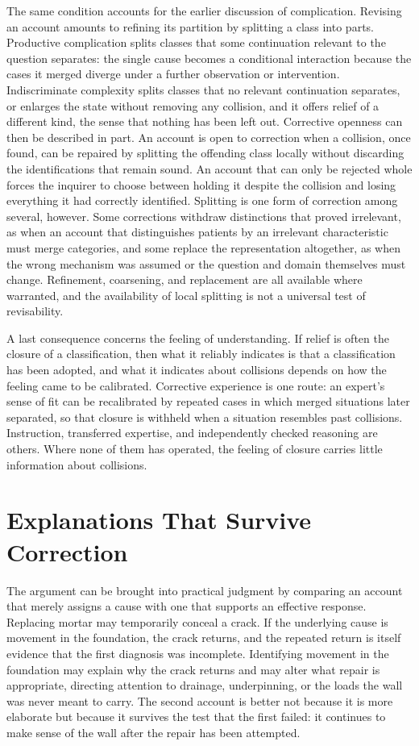 \documentclass[11pt,letterpaper]{article}
\theoremstyle{definition}
\begin{document}
The same condition accounts for the earlier discussion of complication. Revising an account amounts to refining its partition by splitting a class into parts. Productive complication splits classes that some continuation relevant to the question separates: the single cause becomes a conditional interaction because the cases it merged diverge under a further observation or intervention. Indiscriminate complexity splits classes that no relevant continuation separates, or enlarges the state without removing any collision, and it offers relief of a different kind, the sense that nothing has been left out. Corrective openness can then be described in part. An account is open to correction when a collision, once found, can be repaired by splitting the offending class locally without discarding the identifications that remain sound. An account that can only be rejected whole forces the inquirer to choose between holding it despite the collision and losing everything it had correctly identified. Splitting is one form of correction among several, however. Some corrections withdraw distinctions that proved irrelevant, as when an account that distinguishes patients by an irrelevant characteristic must merge categories, and some replace the representation altogether, as when the wrong mechanism was assumed or the question and domain themselves must change. Refinement, coarsening, and replacement are all available where warranted, and the availability of local splitting is not a universal test of revisability.

A last consequence concerns the feeling of understanding. If relief is often the closure of a classification, then what it reliably indicates is that a classification has been adopted, and what it indicates about collisions depends on how the feeling came to be calibrated. Corrective experience is one route: an expert's sense of fit can be recalibrated by repeated cases in which merged situations later separated, so that closure is withheld when a situation resembles past collisions. Instruction, transferred expertise, and independently checked reasoning are others. Where none of them has operated, the feeling of closure carries little information about collisions.

\section{Explanations That Survive Correction}

The argument can be brought into practical judgment by comparing an account that merely assigns a cause with one that supports an effective response. Replacing mortar may temporarily conceal a crack. If the underlying cause is movement in the foundation, the crack returns, and the repeated return is itself evidence that the first diagnosis was incomplete. Identifying movement in the foundation may explain why the crack returns and may alter what repair is appropriate, directing attention to drainage, underpinning, or the loads the wall was never meant to carry. The second account is better not because it is more elaborate but because it survives the test that the first failed: it continues to make sense of the wall after the repair has been attempted.
\end{document}
